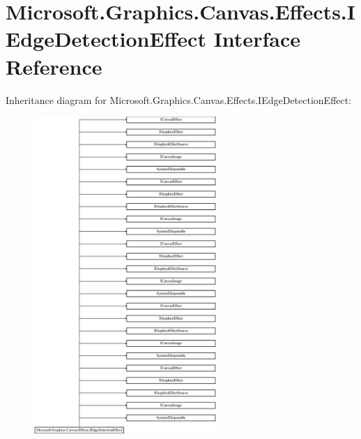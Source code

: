 \hypertarget{interface_microsoft_1_1_graphics_1_1_canvas_1_1_effects_1_1_i_edge_detection_effect}{}\section{Microsoft.\+Graphics.\+Canvas.\+Effects.\+I\+Edge\+Detection\+Effect Interface Reference}
\label{interface_microsoft_1_1_graphics_1_1_canvas_1_1_effects_1_1_i_edge_detection_effect}
Inheritance diagram for Microsoft.\+Graphics.\+Canvas.\+Effects.\+I\+Edge\+Detection\+Effect\+:\begin{figure}[H]
\begin{center}
\leavevmode
\includegraphics[height=12.000000cm]{interface_microsoft_1_1_graphics_1_1_canvas_1_1_effects_1_1_i_edge_detection_effect}
\end{center}
\end{figure}
